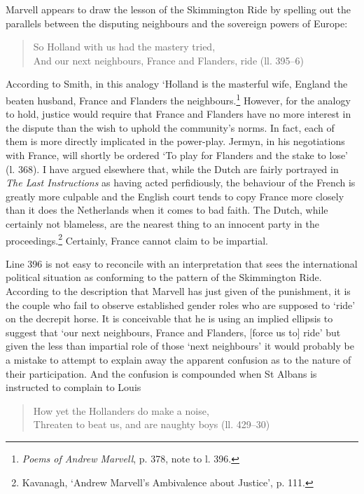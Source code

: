 ﻿\documentclass[12pt]{article}
\newcommand{\citedtitle}[1]{\textit{#1}}
\begin{document}
Marvell
appears to draw the lesson of the Skimmington Ride by spelling out the
parallels between the disputing neighbours and the sovereign powers of Europe:

\begin{verse}
So Holland with us had the mastery tried,\\
And our next neighbours, France and Flanders, ride (ll. 395–6)
\end{verse}

According
to Smith, in this analogy ‘Holland is the masterful wife, England the beaten
husband, France and Flanders the neighbours.\footnote{\citedtitle{Poems of Andrew Marvell}, p. 378, note to l. 396.}
However, for the analogy to hold, justice would require that France and
Flanders have no more interest in the dispute than the wish to uphold the
community’s norms. In fact, each of them is more directly implicated in the
power-play. Jermyn, in his negotiations with France, will shortly be ordered
‘To play for Flanders and the stake to lose’ (l. 368). I have argued elsewhere
that, while the Dutch are fairly portrayed in \citedtitle{The Last Instructions} as having acted
perfidiously, the behaviour of the French is greatly more culpable and the
English court tends to copy France more closely than it does the Netherlands
when it comes to bad faith. The Dutch, while certainly not blameless, are the
nearest thing to an innocent party in the proceedings.\footnote{Kavanagh, ‘Andrew Marvell’s Ambivalence about Justice’, p. 111.}
Certainly, France cannot claim to be impartial.

Line 396 is not easy to reconcile with an
interpretation that sees the international political situation as conforming to
the pattern of the Skimmington Ride. According to the description that Marvell
has just given of the punishment, it is the couple who fail to observe
established gender roles who are supposed to ‘ride’ on the decrepit horse. It
is conceivable that he is using an implied ellipsis to suggest that ‘our next
neighbours, France and Flanders, [force us to] ride’ but given the less than
impartial role of those ‘next neighbours’ it would probably be a mistake to
attempt to explain away the apparent confusion as to the nature of their
participation. And the confusion is compounded when St Albans is instructed to
complain to Louis

\begin{verse}
How yet the Hollanders do make a noise,\\
Threaten to beat us, and are naughty boys (ll. 429–30)
\end{verse}
\end{document}
